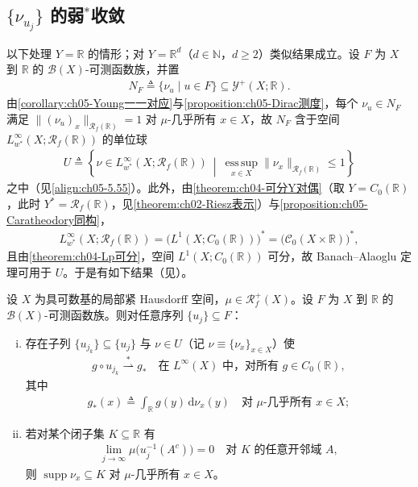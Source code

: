 \documentclass[../../main.tex]{subfiles}%
\begin{document}
\subsection{$\{\nu_{u_j}\}$ 的弱$^*$收敛}\label{subsection:ch05-函数弱星}

以下处理 $Y=\mathbb{R}$ 的情形；对 $Y=\mathbb{R}^d$（$d\in\mathbb{N}$，$d\geqslant2$）类似结果成立。设 $F$ 为 $X$ 到 $\mathbb{R}$ 的 $\mathscr{B}(X)$-可测函数族，并置
\begin{align*}
N_F\triangleq\{\nu_u\mid u\in F\}\subseteq\mathcal{Y}^+(X;\mathbb{R}).
\end{align*}
由\cref{corollary:ch05-Young一一对应}与\cref{proposition:ch05-Dirac测度}，每个 $\nu_u\in N_F$ 满足 $\|(\nu_u)_x\|_{\mathscr{R}_f(\mathbb{R})}=1$ 对 $\mu$-几乎所有 $x\in X$，故 $N_F$ 含于空间 $L^\infty_{w^*}(X;\mathscr{R}_f(\mathbb{R}))$ 的单位球
\begin{align*}
U\triangleq\left\{\nu\in L^\infty_{w^*}(X;\mathscr{R}_f(\mathbb{R}))\ \middle|\
\operatorname*{ess\,sup}_{x\in X}\|\nu_x\|_{\mathscr{R}_f(\mathbb{R})}\leqslant1\right\}
\end{align*}
之中（见\eqref{align:ch05-5.55}）。此外，由\cref{theorem:ch04-可分Y对偶}（取 $Y=C_0(\mathbb{R})$，此时 $Y^*=\mathscr{R}_f(\mathbb{R})$，见\cref{theorem:ch02-Riesz表示}）与\cref{proposition:ch05-Caratheodory同构}，
\begin{align*}
L^\infty_{w^*}(X;\mathscr{R}_f(\mathbb{R}))=\big(L^1(X;C_0(\mathbb{R}))\big)^*=\big(\mathcal{C}_0(X\times\mathbb{R})\big)^*,
\end{align*}
且由\cref{theorem:ch04-Lp可分}，空间 $L^1(X;C_0(\mathbb{R}))$ 可分，故 Banach–Alaoglu 定理可用于 $U$。于是有如下结果（见\cite{ref08}）。

\begin{theorem}[Ball]\label{theorem:ch05-ball}
设 $X$ 为具可数基的局部紧 Hausdorff 空间，$\mu\in\mathscr{R}^+_f(X)$。设 $F$ 为 $X$ 到 $\mathbb{R}$ 的 $\mathscr{B}(X)$-可测函数族。则对任意序列 $\{u_j\}\subseteq F$：
\begin{enumerate}[(i)]
\item\label{item:ch05-ball-i} 存在子列 $\{u_{j_k}\}\subseteq\{u_j\}$ 与 $\nu\in U$（记 $\nu\equiv\{\nu_x\}_{x\in X}$）使
\begin{align}
g\circ u_{j_k}\stackrel{*}{\rightharpoonup}g_*\quad\text{在 }L^\infty(X)\text{ 中，对所有 }g\in C_0(\mathbb{R}),\label{align:ch05-5.66}
\end{align}
其中
\begin{align}
g_*(x)\triangleq\int_{\mathbb{R}}g(y)\,\mathrm{d}\nu_x(y)\quad\text{对 }\mu\text{-几乎所有 }x\in X;\label{align:ch05-5.67}
\end{align}
\item\label{item:ch05-ball-ii} 若对某个闭子集 $K\subseteq\mathbb{R}$ 有
\begin{align}
\lim_{j\to\infty}\mu\big(u_j^{-1}(A^c)\big)=0\quad\text{对 }K\text{ 的任意开邻域 }A,\label{align:ch05-5.68}
\end{align}
则 $\operatorname{supp}\nu_x\subseteq K$ 对 $\mu$-几乎所有 $x\in X$。
\end{enumerate}
\end{theorem}
\end{document}
